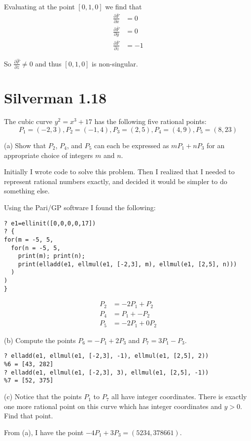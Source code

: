 \documentclass{article}
\begin{document}
Evaluating at the point $[0,1,0]$ we find that
\begin{align*}
\frac{\partial \bar F}{\partial x} &= 0 \\
\frac{\partial \bar F}{\partial y} &= 0 \\
\frac{\partial \bar F}{\partial z} &= -1
\end{align*}

So $\frac{\partial \hat F}{\partial z} \neq 0$ and thus $[0,1,0]$ is non-singular.

\section{Silverman 1.18}
The cubic curve $y^2 = x^3 + 17$ has the following five rational points:
$$P_1 = (-2,3), P_2 = (-1,4), P_3 = (2,5), P_4 = (4,9), P_5 = (8,23)$$

(a) Show that $P_2$, $P_4$, and $P_5$ can each be expressed as $mP_1 + nP_3$ for an appropriate choice of integers $m$ and $n$.

Initially I wrote code to solve this problem. Then I realized that I needed to represent rational numbers exactly, and decided it would be simpler to do something else.

Using the Pari/GP software I found the following:
\begin{verbatim}
? e1=ellinit([0,0,0,0,17])
? {
for(m = -5, 5,
  for(n = -5, 5,
    print(m); print(n);
    print(elladd(e1, ellmul(e1, [-2,3], m), ellmul(e1, [2,5], n)))
  )
)
}
\end{verbatim}

\begin{align*}
P_2 &= -2P_1 + P_2 \\
P_4 &= P_1 + -P_2 \\
P_5 &= -2P_1 + 0P_2
\end{align*}

(b) Compute the points $P_6 = -P_1 + 2P_3$ and $P_7 = 3P_1 - P_3$.
\begin{verbatim}
? elladd(e1, ellmul(e1, [-2,3], -1), ellmul(e1, [2,5], 2))
%6 = [43, 282]
? elladd(e1, ellmul(e1, [-2,3], 3), ellmul(e1, [2,5], -1))
%7 = [52, 375]
\end{verbatim}

(c) Notice that the points $P_1$ to $P_7$ all have integer coordinates. There is exactly one more rational point on this curve which has integer coordinates and $y > 0$. Find that point.

From (a), I have the point $-4P_1 + 3P_3 = (5234, 378661)$.
\end{document}
